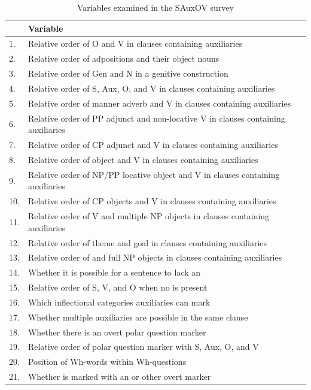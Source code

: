 \documentclass[output=paper,newtxmath,modfonts,nonflat,draftmode]{langsci/langscibook}
\begin{document}
\begin{table}[b]
\caption{Variables examined in the SAuxOV survey} \label{tab:sande:variables} 
\small
\begin{tabular}{ll}
\lsptoprule
	 & \textbf{Variable}\\
	 \hline
	 1. & Relative order of O and V in clauses containing auxiliaries\\
	 2. & Relative order of adpositions and their object nouns\\
	 3. & Relative order of Gen and N in a genitive construction\\
	 4. & Relative order of S, Aux, O, and V in clauses containing auxiliaries\\
	 5. & Relative order of manner adverb and V in clauses containing auxiliaries\\
	 6. & Relative order of PP adjunct and non-locative V in clauses containing auxiliaries\\
	 7. & Relative order of CP adjunct and V in clauses containing auxiliaries\\
	 8. & Relative order of object \isi{pronoun} and V in clauses containing auxiliaries\\
	 9. & Relative order of NP/PP locative object and V in clauses containing auxiliaries\\
	 10. & Relative order of CP objects and V in clauses containing auxiliaries\\
	 11. & Relative order of V and multiple NP objects in clauses containing auxiliaries\\
	 12. & Relative order of theme and goal in clauses containing auxiliaries\\
	 13. & Relative order of \isi{pronoun} and full NP objects in clauses containing auxiliaries\\
	 14. & Whether it is possible for a sentence to lack an \isi{auxiliary}\\
	 15. & Relative order of S, V, and O when no \isi{auxiliary} is present\\
	 16. & Which inflectional categories auxiliaries can mark\\
	 17. & Whether multiple auxiliaries are possible in the same clause\\
	 18. & Whether there is an overt polar question marker\\
	 19. & Relative order of polar question marker with S, Aux, O, and V\\
	 20. & Position of Wh-words within Wh-questions\\
	 21. & Whether \isi{negation} is marked with an \isi{auxiliary} or other overt marker\\

\end{tabular}
\end{table}
\end{document}
